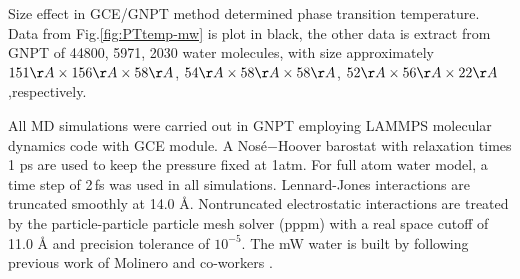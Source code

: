 \documentclass[aps,prl,twocolumn,superscriptaddress]{revtex4-1}
\begin{document}
Size effect in GCE/GNPT method determined phase transition temperature. Data from Fig.\ref{fig:PTtemp-mw} is plot in black, the other data is extract from GNPT of 44800, 5971, 2030 water molecules, with size approximately $151\AA \times  156 \AA \times  58 \AA$, $54 \AA \times  58 \AA \times  58 \AA$, $52\AA \times  56 \AA \times  22\AA$,respectively.

All MD simulations were carried out in GNPT employing LAMMPS molecular dynamics code with GCE module\cite{Xu2012}. A Nosé−Hoover barostat\cite{Nose1984,Hoover1985} with  relaxation times 1 ps are used to keep the pressure fixed at 1atm. For full atom water model, a time step of 2\,fs  was used in all simulations. Lennard-Jones interactions are truncated smoothly at 14.0 Å. Nontruncated electrostatic interactions are treated by the particle-particle particle mesh solver (pppm) with a real space cutoff of 11.0 Å and precision tolerance of $10^{-5}$.  The mW water is built by following previous work of Molinero and co-workers\cite{Molinero2009} .
\end{document}
